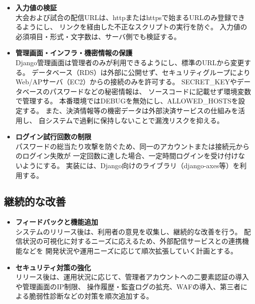 \begin{itemize}
    \item \textbf{入力値の検証} \\
    大会および試合の配信URLは、httpまたはhttpsで始まるURLのみ登録できるようにし、
    リンクを経由した不正なスクリプトの実行を防ぐ。
    入力値の必須項目・形式・文字数は、サーバ側でも検証する。

    \item \textbf{管理画面・インフラ・機密情報の保護} \\
    Django管理画面は管理者のみが利用できるようにし、標準のURLから変更する。
    データベース（RDS）は外部に公開せず、セキュリティグループにより
    Web/APサーバ（EC2）からの接続のみを許可する。
    SECRET\_KEYやデータベースのパスワードなどの秘密情報は、
    ソースコードに記載せず環境変数で管理する。
    本番環境ではDEBUGを無効にし、ALLOWED\_HOSTSを設定する。
    また、決済情報等の機密データは外部決済サービスの仕組みを活用し、
    自システムで過剰に保持しないことで漏洩リスクを抑える。

    \item \textbf{ログイン試行回数の制限} \\
    パスワードの総当たり攻撃を防ぐため、同一のアカウントまたは接続元からのログイン失敗が
    一定回数に達した場合、一定時間ログインを受け付けないようにする。
    実装には、Django向けのライブラリ（django-axes等）を利用する。
\end{itemize}

\subsection{継続的な改善}

\begin{itemize}
    \item \textbf{フィードバックと機能追加} \\
    システムのリリース後は、利用者の意見を収集し、継続的な改善を行う。
    配信状況の可視化に対するニーズに応えるため、外部配信サービスとの連携機能などを
    開発状況や運用ニーズに応じて順次拡張していく計画とする。

    \item \textbf{セキュリティ対策の強化} \\
    リリース後は、運用状況に応じて、管理者アカウントへの二要素認証の導入や管理画面のIP制限、
    操作履歴・監査ログの拡充、WAFの導入、第三者による脆弱性診断などの対策を順次追加する。
\end{itemize}